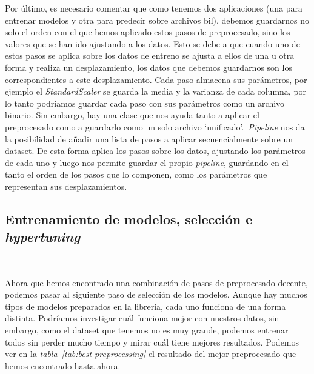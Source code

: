 Por último, es necesario comentar que como tenemos dos aplicaciones (una para entrenar modelos y otra para predecir sobre archivos \gls{bil}),
debemos guardarnos no solo el orden con el que hemos aplicado estos pasos de preprocesado, sino los valores que se han ido ajustando a los datos.
Esto se debe a que cuando uno de estos pasos se aplica sobre los datos de entreno se ajusta a ellos de una u otra forma y realiza un desplazamiento, los datos que debemos guardarnos
son los correspondientes a este desplazamiento. Cada paso almacena sus parámetros, por ejemplo el \textit{StandardScaler} se guarda la media y la varianza de cada columna,
por lo tanto podríamos guardar cada paso con sus parámetros como un archivo binario. Sin embargo, hay una clase que nos ayuda tanto a aplicar el preprocesado como a guardarlo como un solo
archivo `unificado'.\ \textit{Pipeline} nos da la posibilidad de añadir 
una lista de pasos a aplicar secuencialmente sobre un \gls{dataset}. De esta forma aplica los pasos sobre los datos, ajustando los parámetros de cada uno y luego nos permite
guardar el propio \textit{pipeline}, guardando en el tanto el orden de los pasos que lo componen, como los parámetros que representan sus desplazamientos.\ \cite{sklearnp32:online}


\subsection{Entrenamiento de modelos, selección e \textit{hypertuning}}\ \label{sec:entrenamiento}

Ahora que hemos encontrado una combinación de pasos de preprocesado decente, podemos pasar al siguiente paso de selección de los modelos. Aunque hay muchos tipos de modelos 
preparados en la librería, cada uno funciona de una forma distinta. Podríamos investigar cuál funciona mejor con nuestros datos, sin embargo, como el \gls{dataset} que 
tenemos no es muy grande, podemos entrenar todos sin perder mucho tiempo y mirar cuál tiene mejores resultados. Podemos ver en la \textit{tabla\ \ref{tab:best-preprocessing}}
el resultado del mejor preprocesado que hemos encontrado hasta ahora.

